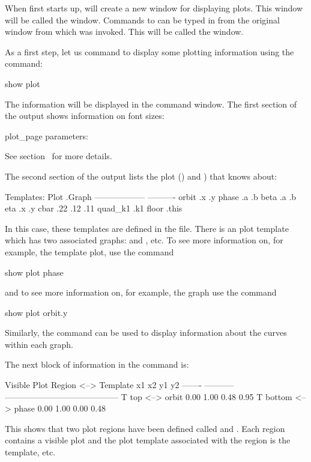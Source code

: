 When \tao first starts up, \tao will create a new window for
displaying plots. This window will be called the 
window. Commands to \tao can be typed in from the original window from
which \tao was invoked. This will be called the  window.

As a first step, let us command \tao to display some plotting
information using the command:
\begin{example}
  show plot
\end{example}
The information will be displayed in the command window. The first
section of the  output shows information on font sizes:
\begin{example}
  plot_page parameters:
\end{example}
See section~ for more details. 

The second section of the  output
lists the plot  () and
) that \tao knows about:
\begin{example}
 Templates:
   Plot                .Graph
   ------------------  ----------
   orbit               .x  .y
   phase               .a  .b
   beta                .a  .b
   eta                 .x  .y
   cbar                .22  .12  .11
   quad_k1             .k1
   floor               .this
\end{example}
In this case, these templates are defined in the 
file. There is an  plot template which has two associated
graphs:  and , etc. To see more information on, for example,
the  template plot, use the command
\begin{example}
  show plot phase
\end{example}
and to see more information on, for example, the  graph use the command
\begin{example}
  show plot orbit.y
\end{example}
Similarly, the  command can be used to display
information about the curves within each graph.

The next block of information in the  command is:
\begin{example}
Visible  Plot Region         <-->  Template             x1    x2    y1    y2
-------  -----------               -----------------------------------------
   T     top                 <-->  orbit               0.00  1.00  0.48  0.95
   T     bottom              <-->  phase               0.00  1.00  0.00  0.48
\end{example}
This shows that two plot regions have been defined called  and
. Each region contains a visible plot and the plot template
associated with the  region is the  template, etc.

